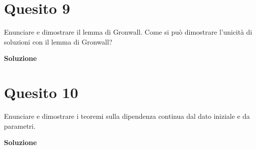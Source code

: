 \section*{Quesito 9}
Enunciare e dimostrare il lemma di Gronwall. Come si può dimostrare l'unicità
di soluzioni con il lemma di Gronwall?

\medskip
\begin{large}
\textbf{Soluzione}
\end{large}


\section*{Quesito 10}
Enunciare e dimostrare i teoremi sulla dipendenza continua dal dato iniziale
e da parametri.

\medskip
\begin{large}
\textbf{Soluzione}
\end{large}
